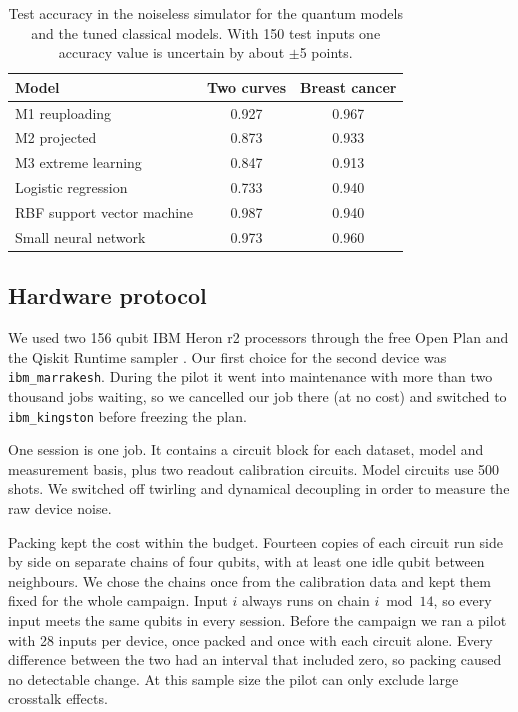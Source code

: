 \documentclass[10pt,conference]{IEEEtran}
\begin{document}
\begin{table}[t]
\centering
\caption{Test accuracy in the noiseless simulator for the quantum models and the tuned classical
models. With 150 test inputs one accuracy value is uncertain by about $\pm$5 points.}
\label{tab:sim}
\footnotesize
\begin{tabular}{lcc}
\toprule
Model & Two curves & Breast cancer \\
\midrule
M1 reuploading & 0.927 & 0.967 \\
M2 projected & 0.873 & 0.933 \\
M3 extreme learning & 0.847 & 0.913 \\
\midrule
Logistic regression & 0.733 & 0.940 \\
RBF support vector machine & 0.987 & 0.940 \\
Small neural network & 0.973 & 0.960 \\
\bottomrule
\end{tabular}
\end{table}

\subsection{Hardware protocol}
We used two 156 qubit IBM Heron r2 processors through the free Open Plan and the Qiskit Runtime
sampler \cite{javadiabhari2024qiskit}. Our first choice for the second device was
\texttt{ibm\_marrakesh}. During the pilot it went into maintenance with more than two thousand jobs
waiting, so we cancelled our job there (at no cost) and switched to \texttt{ibm\_kingston}
before freezing the plan.

One session is one job. It contains a circuit block for each dataset, model and measurement basis,
plus two readout calibration circuits. Model circuits use 500 shots. We switched off twirling and dynamical decoupling in order to measure the raw device noise.

Packing kept the cost within the budget. Fourteen copies of each circuit run side by side on separate
chains of four qubits, with at least one idle qubit between neighbours. We chose the chains once
from the calibration data and kept them fixed for the whole campaign. Input $i$ always runs on
chain $i \bmod 14$, so every input meets the same qubits in every session. Before the campaign we ran a pilot with 28 inputs per device, once packed and once with each circuit alone. Every
difference between the two had an interval that included zero, so packing caused no detectable change. At this sample size the pilot can only exclude large
crosstalk effects.
\end{document}
